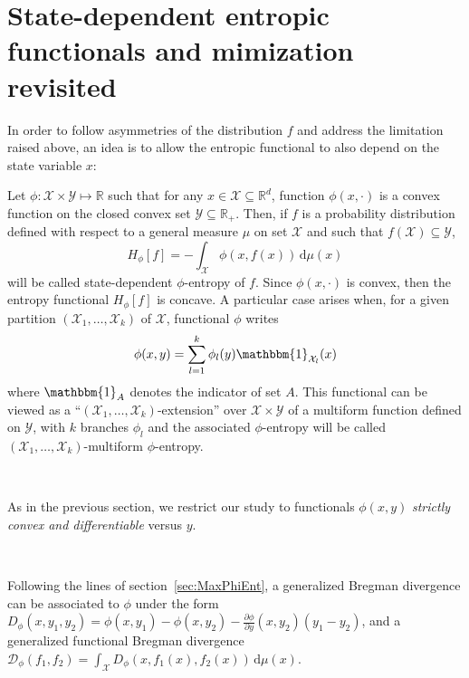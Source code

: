 \documentclass[entropy,article,submit,moreauthors,pdftex]{Definitions/mdpi}
\def\dmu{\mathrm{d}\mu}
\def\fD{\mathcal{D}}
\def\Rset{\mathbb{R}}
\def\X{\mathcal{X}}
\def\Y{\mathcal{Y}}
\def\un{\mathbbm{1}}
\begin{document}

\section{State-dependent entropic functionals and mimization revisited}
\label{sec:MultiformEnt}

In  order  to  follow  asymmetries  of the  distribution  $f$  and  address  the
limitation raised  above, an idea  is to allow  the entropic functional  to also
depend on the state variable $x$:
%
\begin{Definition}
\label{def:asym_phi-entropy}
%
  Let $\phi: \X \times  \Y \mapsto \Rset$ such that for any  $x \in \X \subseteq
  \Rset^d$, function $\phi(x,\cdot)$  is a convex function on  the closed convex
  set  $\Y \subseteq  \Rset_+$.   Then,  if $f$  is  a probability  distribution
  defined with  respect to  a general measure  $\mu$ on set  $\X$ and  such that
  $f(\X) \subseteq \Y$,
  \begin{equation}\label{eq:asym_phi-entropy}
  H_\phi[f] = - \int_\X \phi(x,f(x)) \, \dmu(x)
  \end{equation}
  will be  called state-dependent $\phi$-entropy of  $f$.  Since $\phi(x,\cdot)$
  is convex, then the entropy functional $H_\phi[f]$ is concave.
  A particular case arises when, for  a given partition $(\X_1 , \ldots , \X_k)$
  of $\X$, functional $\phi$ writes
  \begin{equation}\label{eq:multiform_phi-entropy}
  \phi(x,y) = \sum_{l=1}^k \phi_l(y) \un_{\X_l}(x)
  \end{equation}
  where $\un_A$ denotes the indicator of set $A$.  This functional can be viewed
  as a ``$(\X_1 , \ldots , \X_k)$-extension'' over $\X \times \Y$ of a multiform
  function  defined on  $\Y$,  with  $k$ branches  $\phi_l$  and the  associated
  $\phi$-entropy   will   be  called   $(\X_1   ,   \ldots  ,   \X_k)$-multiform
  $\phi$-entropy.
\end{Definition}

\

As in  the previous section,  we restrict  our study to  functionals $\phi(x,y)$
{\em strictly convex and differentiable} versus $y$.

\

Following  the  lines  of  section~\ref{sec:MaxPhiEnt},  a  generalized  Bregman
divergence  can be  associated to  $\phi$  under the  form $D_\phi(x,y_1,y_2)  =
\phi(x,y_1) - \phi(x,y_2) - \frac{\partial \phi}{\partial y}(x,y_2) \left( y_1 -
y_2  \right)$, and  a generalized  functional Bregman  divergence $\displaystyle
\fD_\phi(f_1,f_2) = \int_\X D_\phi(x,f_1(x),f_2(x)) \, \dmu(x)$.
\end{document}
